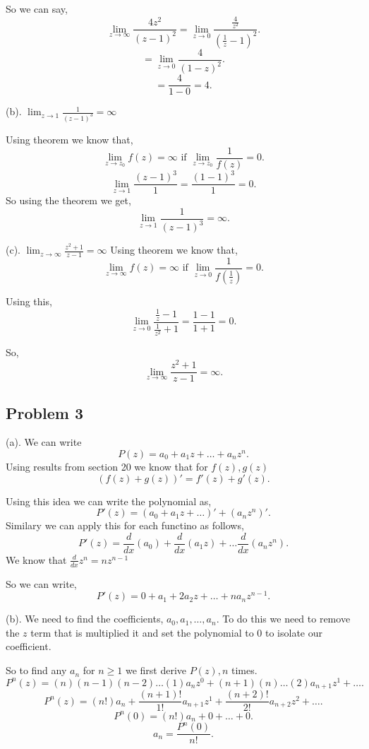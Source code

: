 \documentclass[a4paper]{report}
\begin{document}
So we can say, \[
    \lim_{z \to \infty} \frac{4z^2}{(z-1)^2} = \lim_{z \to 0} \frac{\frac{4}{z^2}}{(\frac{1}{z} - 1)^2}
.\]
\[
    = \lim_{z \to 0} \frac{4}{(1 - z)^2}
.\] 
\[
    = \frac{4}{1-0} = 4
.\] 

(b). $\lim_{z \to 1} \frac{1}{(z-1)^3} = \infty$

Using theorem we know that, \[
    \lim_{z \to z_0} f(z) = \infty \text{ if } \lim_{z \to z_0} \frac{1}{f(z)} = 0
.\] 
\[
    \lim_{z \to 1} \frac{(z-1)^3}{1} = \frac{(1-1)^3}{1} = 0
.\] 
So using the theorem we get, \[
 \lim_{z \to 1} \frac{1}{(z-1)^3} = \infty
.\] 

(c). $\lim_{z \to \infty} \frac{z^2 + 1}{z-1} = \infty$
Using theorem we know that, \[
    \lim_{z \to \infty} f(z) = \infty \text{ if } \lim_{z \to 0} \frac{1}{f(\frac{1}{z})} = 0
.\] 

Using this, \[
    \lim_{z \to 0} \frac{\frac{1}{z} - 1}{\frac{1}{z^2} + 1} = \frac{1 - 1}{1 + 1} = 0
.\]         

So, \[
 \lim_{z \to \infty} \frac{z^2 + 1}{z-1} = \infty
.\] 



\subsection*{Problem 3}
(a).  We can write \[
P(z) = a_0 + a_1z + \dots + a_nz^n 
.\]
Using results from section 20 we know that for $f(z),g(z)$\[
    (f(z) + g(z))' = f'(z) + g'(z)
.\] 

Using this idea we can write the polynomial as, \[
    P'(z) = (a_0+ a_1z + \dots)' + (a_nz^n)'
.\] 
Similary we can apply this for each functino as follows,\[
    P'(z) = \frac{d}{dx}(a_0) + \frac{d}{dx}(a_1z) + \dots \frac{d}{dx}(a_nz^n)
.\] 
We know that $\frac{d}{dx}z^n = nz^{n - 1}$ 

So we can write, \[
    P'(z) = 0 + a_1 + 2a_2z + \dots + na_nz^{n-1}
.\] 

(b). We need to find the coefficients, $a_0,a_1,\dots,a_n$. To do this we need to remove the $z$ term that is multiplied it and set the polynomial to  $0$ to isolate our coefficient.

So to find any $a_n$  for $n \ge 1$ we first derive $P(z), n$  times.
\[
    P^{n}(z) = (n)(n-1)(n-2)\dots(1)a_nz^0 + (n+1)(n)\dots(2)a_{n+1}z^1 + \dots
.\] \[
P^{n} (z) = (n!)a_n + \frac{(n+1)!}{1!}a_{n+1}z^1 + \frac{(n+2)!}{2!}a_{n + 2}z^2 + \dots
.\] 
\[
P^n (0) = (n!)a_n + 0 + \dots + 0
.\] 
\[
a_n = \frac{P^n(0)}{n!}
.\] 
\end{document}

